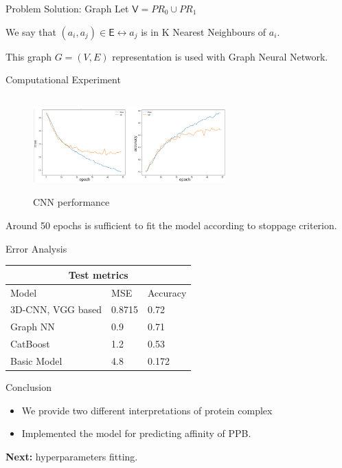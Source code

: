 \documentclass{beamer}
\begin{document}
\begin{frame}{Problem Solution: Graph}
Let $\mathsf{V} = PR_0 \cup PR_1$
\bigskip

We say that $(a_i, a_j) \in \mathsf{E} \leftrightarrow a_j$ is in K Nearest Neighbours of $a_i$.
\bigskip

This graph $G = (V, E)$ representation is used with Graph Neural Network.
\end{frame}

\begin{frame}{Computational Experiment}

\begin{figure}
\includegraphics[width=280px, height=140px]{CNN_error.png}
\caption{\label{fig:your-figure}CNN performance}
\end{figure}

Around 50 epochs is sufficient to fit the model according to stoppage criterion.
\end{frame}

\begin{frame}{Error Analysis}
\begin{tabular}{ |p{4cm}|p{3cm}|p{3cm}|  }
    \hline
    \multicolumn{3}{|c|}{Test metrics} \\
    \hline
    Model & MSE & Accuracy\\
    \hline
    3D-CNN, VGG based & 0.8715 & 0.72\\
    Graph NN & 0.9 & 0.71 \\
    CatBoost & 1.2 & 0.53\\
    Basic Model & 4.8 & 0.172\\
    \hline
\end{tabular}
\end{frame}

\begin{frame}{Conclusion}
\begin{itemize}
    \item We provide two different interpretations of protein complex
    \item Implemented the model for predicting affinity of PPB.
\end{itemize}
\textbf{Next:} hyperparameters fitting. 
\end{frame}
\end{document}
